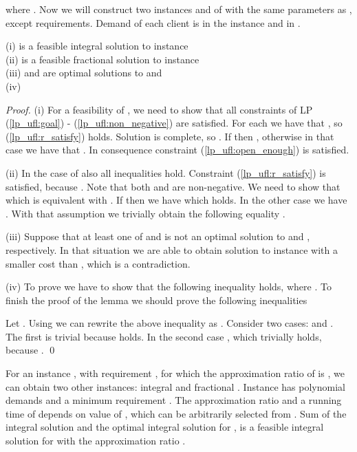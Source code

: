 \documentclass{llncs}
\begin{document}
where . Now we will construct two instances  and  of  with the same parameters as , except requirements. Demand of each client  is  in the instance  and  in .

\begin{lemma}
 (i)  is a feasible integral solution to instance  \\
 (ii)  is a feasible fractional solution to instance  \\
 (iii)  and  are optimal solutions to  and  \\
 (iv) 
\end{lemma}

\begin{proof}
 (i) For a feasibility of , we need to show that all constraints of LP (\ref{lp_ufl:goal}) - (\ref{lp_ufl:non_negative}) are satisfied. For each  we have that , so (\ref{lp_ufl:r_satisfy}) holds. Solution  is complete, so . If  then , otherwise  in that case we have that . In consequence constraint (\ref{lp_ufl:open_enough}) is satisfied.
 
 (ii) In the case of  also all inequalities hold. Constraint (\ref{lp_ufl:r_satisfy}) is satisfied, because . Note that both  and  are non-negative. We need to show that  which is equivalent with . If  then we have  which holds. In the other case we have . With that assumption we trivially obtain the following equality .
 
 (iii) Suppose that at least one of  and  is not an optimal solution to  and , respectively. In that situation we are able to obtain solution to instance  with a smaller cost than , which is a contradiction.
 
 (iv) To prove  we have to show that the following inequality holds,  where . 
 To finish the proof of the lemma we should prove the following inequalities
 
 Let . Using  we can rewrite the above inequality as . Consider two cases:  and . The first is trivial because  holds. In the second case , which trivially holds, because .
\qed
\end{proof}

\begin{corollary}
 For an instance , with requirement , for which the approximation ratio of  is , we can obtain two other instances: integral  and fractional . Instance  has polynomial demands and a minimum requirement . The approximation ratio  and a running time of  depends on value of , which can be arbitrarily selected from . Sum of the integral solution  and the optimal integral solution for , is a feasible integral solution for  with the approximation ratio .
\end{corollary}
\end{document}
